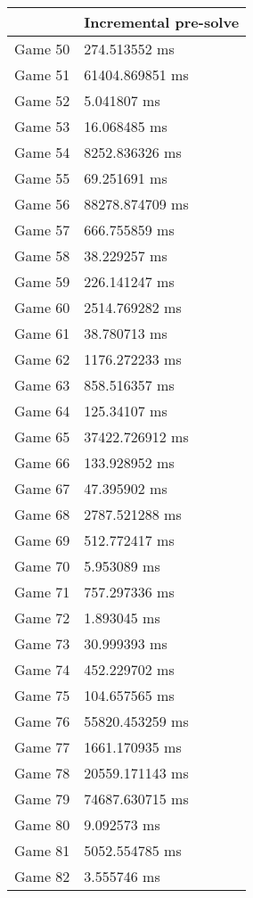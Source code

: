 \begin{tabular}{|l|l|}
	\hline
	& Incremental pre-solve \\ \hline
	Game 50 & 274.513552 ms \\ \hline
	Game 51 & 61404.869851 ms \\ \hline
	Game 52 & 5.041807 ms \\ \hline
	Game 53 & 16.068485 ms \\ \hline
	Game 54 & 8252.836326 ms \\ \hline
	Game 55 & 69.251691 ms \\ \hline
	Game 56 & 88278.874709 ms \\ \hline
	Game 57 & 666.755859 ms \\ \hline
	Game 58 & 38.229257 ms \\ \hline
	Game 59 & 226.141247 ms \\ \hline
	Game 60 & 2514.769282 ms \\ \hline
	Game 61 & 38.780713 ms \\ \hline
	Game 62 & 1176.272233 ms \\ \hline
	Game 63 & 858.516357 ms \\ \hline
	Game 64 & 125.34107 ms \\ \hline
	Game 65 & 37422.726912 ms \\ \hline
	Game 66 & 133.928952 ms \\ \hline
	Game 67 & 47.395902 ms \\ \hline
	Game 68 & 2787.521288 ms \\ \hline
	Game 69 & 512.772417 ms \\ \hline
	Game 70 & 5.953089 ms \\ \hline
	Game 71 & 757.297336 ms \\ \hline
	Game 72 & 1.893045 ms \\ \hline
	Game 73 & 30.999393 ms \\ \hline
	Game 74 & 452.229702 ms \\ \hline
	Game 75 & 104.657565 ms \\ \hline
	Game 76 & 55820.453259 ms \\ \hline
	Game 77 & 1661.170935 ms \\ \hline
	Game 78 & 20559.171143 ms \\ \hline
	Game 79 & 74687.630715 ms \\ \hline
	Game 80 & 9.092573 ms \\ \hline
	Game 81 & 5052.554785 ms \\ \hline
	Game 82 & 3.555746 ms \\ \hline

\end{tabular}
